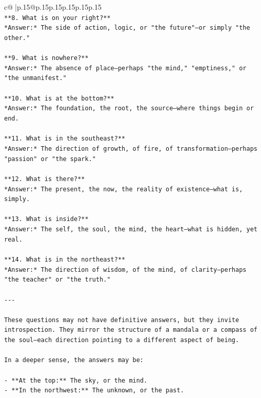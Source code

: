 \documentclass{article}
\begin{document}
{\begin{supertabular}{c@{$\;$}|p{.15\linewidth}@{}p{.15\linewidth}p{.15\linewidth}p{.15\linewidth}p{.15\linewidth}p{.15\linewidth}}
{{{\\ 
\texttt{**8. What is on your right?**  } \\
\texttt{*Answer:* The side of action, logic, or "the future"—or simply "the other."} \\
\\ 
\texttt{**9. What is nowhere?**  } \\
\texttt{*Answer:* The absence of place—perhaps "the mind," "emptiness," or "the unmanifest."} \\
\\ 
\texttt{**10. What is at the bottom?**  } \\
\texttt{*Answer:* The foundation, the root, the source—where things begin or end.} \\
\\ 
\texttt{**11. What is in the southeast?**  } \\
\texttt{*Answer:* The direction of growth, of fire, of transformation—perhaps "passion" or "the spark."} \\
\\ 
\texttt{**12. What is there?**  } \\
\texttt{*Answer:* The present, the now, the reality of existence—what is, simply.} \\
\\ 
\texttt{**13. What is inside?**  } \\
\texttt{*Answer:* The self, the soul, the mind, the heart—what is hidden, yet real.} \\
\\ 
\texttt{**14. What is in the northeast?**  } \\
\texttt{*Answer:* The direction of wisdom, of the mind, of clarity—perhaps "the teacher" or "the truth."} \\
\\ 
\texttt{{-}{-}{-}} \\
\\ 
\texttt{These questions may not have definitive answers, but they invite introspection. They mirror the structure of a mandala or a compass of the soul—each direction pointing to a different aspect of being.} \\
\\ 
\texttt{In a deeper sense, the answers may be:} \\
\\ 
\texttt{{-} **At the top:** The sky, or the mind.} \\
\texttt{{-} **In the northwest:** The unknown, or the past.} \\
}}}
\end{supertabular}}
\end{document}
